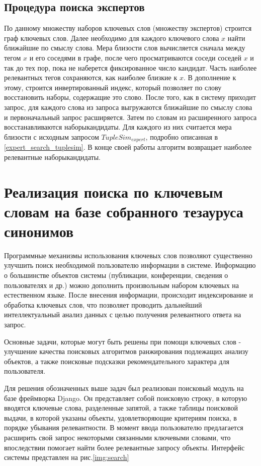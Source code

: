 \subsection{Процедура поиска экспертов}
По данному множеству наборов ключевых слов (множеству экспертов) строится граф ключевых слов. Далее необходимо для каждого ключевого слова $x$ найти ближайшие по смыслу слова. Мера близости слов вычисляется сначала между тегом $x$ и его соседями в графе, после чего просматриваются соседи соседей $x$ и так до тех пор, пока не наберется фиксированное число кандидат. Часть наиболее релевантных тегов сохраняются, как наиболее близкие к $x$. В дополнение к этому, строится инвертированный индекс, который позволяет по слову восстановить наборы, содержащие это слово. После того, как в систему приходит запрос, для каждого слова из запроса выгружаются ближайшие по смыслу слова и первоначальный запрос расширяется. Затем по словам из расширенного запроса восстанавливаются наборы­кандидаты. Для каждого из них считается мера близости с исходным запросом $TupleSim_{expert}$, подробно описанная в \ref{expert_search_tuplesim}. В конце своей работы алгоритм возвращает наиболее релевантные наборы­кандидаты.
\section{Реализация поиска по ключевым словам на базе собранного тезауруса синонимов}
Программные механизмы использования ключевых слов позволяют существенно улучшить поиск необходимой пользователю информации в системе. Информацию о большинстве объектов системы (публикации, конференции, сведения о пользователях и др.) можно дополнить произвольным набором ключевых на естественном языке. После внесения информации, происходит индексирование и обработка ключевых слов, что позволяет проводить дальнейший интеллектуальный анализ данных с целью получения релевантного ответа на запрос.

Основные задачи, которые могут быть решены при помощи ключевых слов - улучшение качества поисковых алгоритмов ранжирования подлежащих анализу объектов, а также поисковые подсказки рекомендательного характера для пользователя.

Для решения обозначенных выше задач был реализован поисковый модуль на базе фреймворка Django. Он представляет собой поисковую строку, в которую вводятся ключевые слова, разделенные запятой, а также таблицы поисковой выдачи, в которой указаны объекты, удовлетворяющие критериям поиска, в порядке убывания релевантности. В момент ввода пользователю предлагается расширить свой запрос некоторыми связанными ключевыми словами, что впоследствии помогает найти более релевантные запросу объекты. Интерфейс системы представлен на рис.\ref{img:search}

